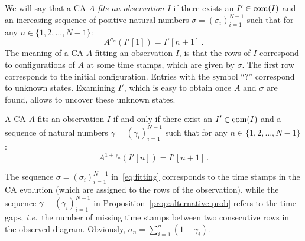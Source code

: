 We will say that a CA $A$ \emph{fits an observation $I$} if there exists an $I'\in\operatorname{com}(I)$ and an increasing sequence of positive natural numbers $\sigma = (\sigma_i)_{i=1}^{N-1}$ such that for any $n\in\{1,2,\dotsc,N-1\}$:
\begin{equation}
	A^{\sigma_n}(I'[1]) = I'[n+1]\,.
	\label{eq:fitting}
\end{equation}
The meaning of a CA $A$ fitting an observation $I$, is that the rows of $I$ correspond to configurations of $A$ at some time stamps, which are given by $\sigma$. The first row corresponds to the initial configuration. Entries with the symbol ``?'' correspond to unknown states. Examining $I'$, which is easy to obtain once $A$ and $\sigma$ are found, allows to uncover these unknown states.

\begin{prop}\label{prop:alternative-prob}
	A CA $A$ fits an observation $I$ if and only if there exist an $I'\in\operatorname{com}(I)$ and a sequence of natural numbers $\gamma = (\gamma_i)_{i=1}^{N-1}$ such that for any $n\in\{1,2,\dotsc,N-1\}$:
	\begin{equation}
		A^{1+\gamma_n}(I'[n]) = I'[n+1]\,.
	\end{equation}
\end{prop}

The sequence $\sigma=(\sigma_i)_{i=1}^{N-1}$ in~\eqref{eq:fitting} corresponds to the time stamps in the CA evolution (which are assigned to the rows of the observation), while the sequence $\gamma = (\gamma_i)_{i=1}^{N-1}$ in Proposition~\ref{prop:alternative-prob} refers to the time gaps, \emph{i.e.}\ the number of missing time stamps between two consecutive rows in the observed diagram. Obviously, $\sigma_{n} = \sum_{i=1}^n (1+\gamma_i)$.

